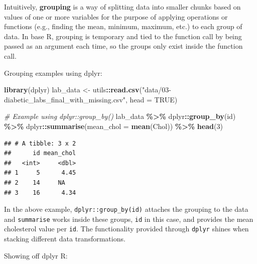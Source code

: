 \documentclass[
]{book}
\newenvironment{Shaded}{\begin{snugshade}}{\end{snugshade}}
\newcommand{\AttributeTok}[1]{\textcolor[rgb]{0.13,0.29,0.53}{#1}}
\newcommand{\CommentTok}[1]{\textcolor[rgb]{0.56,0.35,0.01}{\textit{#1}}}
\newcommand{\ConstantTok}[1]{\textcolor[rgb]{0.56,0.35,0.01}{#1}}
\newcommand{\DecValTok}[1]{\textcolor[rgb]{0.00,0.00,0.81}{#1}}
\newcommand{\FunctionTok}[1]{\textcolor[rgb]{0.13,0.29,0.53}{\textbf{#1}}}
\newcommand{\NormalTok}[1]{#1}
\newcommand{\OtherTok}[1]{\textcolor[rgb]{0.56,0.35,0.01}{#1}}
\newcommand{\SpecialCharTok}[1]{\textcolor[rgb]{0.81,0.36,0.00}{\textbf{#1}}}
\newcommand{\StringTok}[1]{\textcolor[rgb]{0.31,0.60,0.02}{#1}}
\begin{document}
Intuitively, \textbf{grouping} is a way of splitting data into smaller chunks based on values of one or more variables for the purpose of applying operations or functions (e.g., finding the mean, minimum, maximum, etc.) to each group of data. In base R, grouping is temporary and tied to the function call by being passed as an argument each time, so the groups only exist inside the function call.

Grouping examples using dplyr:

\begin{Shaded}
\begin{Highlighting}[]
\FunctionTok{library}\NormalTok{(dplyr)}
\NormalTok{lab\_data }\OtherTok{\textless{}{-}}\NormalTok{ utils}\SpecialCharTok{::}\FunctionTok{read.csv}\NormalTok{(}\StringTok{"data/03{-}diabetic\_labs\_final\_with\_missing.csv"}\NormalTok{, }\AttributeTok{head =} \ConstantTok{TRUE}\NormalTok{)}

\CommentTok{\# Example using dplyr::group\_by()}
\NormalTok{lab\_data }\SpecialCharTok{\%\textgreater{}\%} 
\NormalTok{    dplyr}\SpecialCharTok{::}\FunctionTok{group\_by}\NormalTok{(id) }\SpecialCharTok{\%\textgreater{}\%} 
\NormalTok{    dplyr}\SpecialCharTok{::}\FunctionTok{summarise}\NormalTok{(}\AttributeTok{mean\_chol =} \FunctionTok{mean}\NormalTok{(Chol)) }\SpecialCharTok{\%\textgreater{}\%}
    \FunctionTok{head}\NormalTok{(}\DecValTok{3}\NormalTok{)}
\end{Highlighting}
\end{Shaded}

\begin{verbatim}
## # A tibble: 3 x 2
##      id mean_chol
##   <int>     <dbl>
## 1     5      4.45
## 2    14     NA   
## 3    16      4.34
\end{verbatim}

In the above example, \texttt{dplyr::group\_by(id)} attaches the grouping to the data and \texttt{summarise} works inside these groups, \texttt{id} in this case, and provides the mean cholesterol value per \texttt{id}. The functionality provided through \texttt{dplyr} shines when stacking different data transformations.

Showing off dplyr R:
\end{document}
